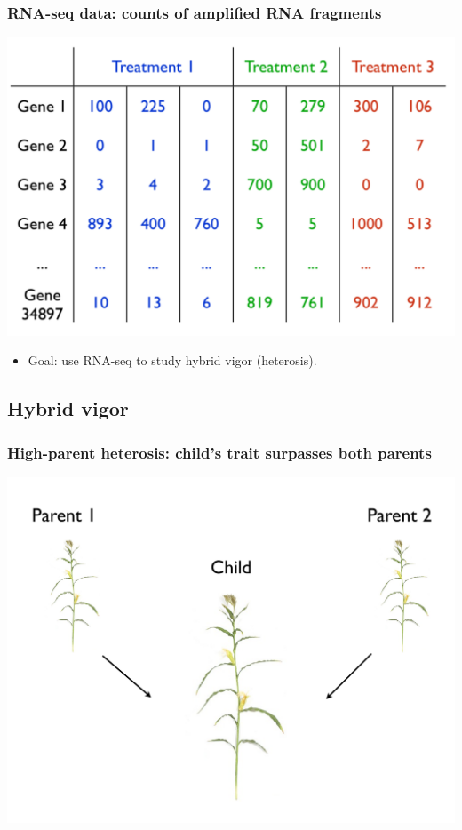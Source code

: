 \documentclass[handout]{beamer}
\numberwithin{equation}{section}
\begin{document}
\begin{frame}
\frametitle{RNA-seq data: counts of amplified RNA fragments}
\begin{center}
\includegraphics[scale=.35]{fig/rnaseqdata}
\end{center}

\begin{itemize}
\item Goal: use RNA-seq to study hybrid vigor (heterosis).
\end{itemize}

\end{frame}




\subsection{Hybrid vigor}


\begin{frame}
\frametitle{High-parent heterosis: child's trait surpasses both parents}
\begin{center}
\includegraphics[scale=.3]{fig/hph}
\end{center}
\end{frame}
\end{document}
